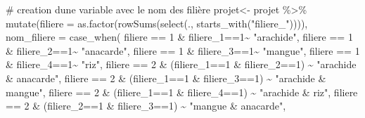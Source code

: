 \documentclass[
  letterpaper,
  DIV=11,
  numbers=noendperiod]{scrartcl}
\newenvironment{Shaded}{\begin{snugshade}}{\end{snugshade}}
\newcommand{\AttributeTok}[1]{\textcolor[rgb]{0.40,0.45,0.13}{#1}}
\newcommand{\CommentTok}[1]{\textcolor[rgb]{0.37,0.37,0.37}{#1}}
\newcommand{\DecValTok}[1]{\textcolor[rgb]{0.68,0.00,0.00}{#1}}
\newcommand{\FunctionTok}[1]{\textcolor[rgb]{0.28,0.35,0.67}{#1}}
\newcommand{\NormalTok}[1]{\textcolor[rgb]{0.00,0.23,0.31}{#1}}
\newcommand{\OtherTok}[1]{\textcolor[rgb]{0.00,0.23,0.31}{#1}}
\newcommand{\SpecialCharTok}[1]{\textcolor[rgb]{0.37,0.37,0.37}{#1}}
\newcommand{\StringTok}[1]{\textcolor[rgb]{0.13,0.47,0.30}{#1}}
\begin{document}
\begin{Shaded}
\begin{Highlighting}[]
\CommentTok{\# creation d\textquotesingle{}une variable avec le nom des filière}
\NormalTok{projet}\OtherTok{\textless{}{-}}\NormalTok{ projet }\SpecialCharTok{\%\textgreater{}\%} 
            \FunctionTok{mutate}\NormalTok{(}\AttributeTok{filiere =} \FunctionTok{as.factor}\NormalTok{(}\FunctionTok{rowSums}\NormalTok{(}\FunctionTok{select}\NormalTok{(., }\FunctionTok{starts\_with}\NormalTok{(}\StringTok{"filiere\_"}\NormalTok{)))),}
                    \AttributeTok{nom\_filiere =} \FunctionTok{case\_when}\NormalTok{(}
\NormalTok{                                      filiere }\SpecialCharTok{==} \DecValTok{1} \SpecialCharTok{\&}\NormalTok{ filiere\_1}\SpecialCharTok{==}\DecValTok{1}\SpecialCharTok{\textasciitilde{}} \StringTok{"arachide"}\NormalTok{,}
\NormalTok{                                      filiere }\SpecialCharTok{==} \DecValTok{1} \SpecialCharTok{\&}\NormalTok{ filiere\_2}\SpecialCharTok{==}\DecValTok{1}\SpecialCharTok{\textasciitilde{}} \StringTok{"anacarde"}\NormalTok{,}
\NormalTok{                                      filiere }\SpecialCharTok{==} \DecValTok{1} \SpecialCharTok{\&}\NormalTok{ filiere\_3}\SpecialCharTok{==}\DecValTok{1}\SpecialCharTok{\textasciitilde{}} \StringTok{"mangue"}\NormalTok{,}
\NormalTok{                                      filiere }\SpecialCharTok{==} \DecValTok{1} \SpecialCharTok{\&}\NormalTok{ filiere\_4}\SpecialCharTok{==}\DecValTok{1}\SpecialCharTok{\textasciitilde{}} \StringTok{"riz"}\NormalTok{,}
\NormalTok{                                      filiere }\SpecialCharTok{==} \DecValTok{2} \SpecialCharTok{\&}\NormalTok{ (filiere\_1}\SpecialCharTok{==}\DecValTok{1} \SpecialCharTok{\&}\NormalTok{ filiere\_2}\SpecialCharTok{==}\DecValTok{1}\NormalTok{) }\SpecialCharTok{\textasciitilde{}} \StringTok{"arachide \& anacarde"}\NormalTok{,}
\NormalTok{                                      filiere }\SpecialCharTok{==} \DecValTok{2} \SpecialCharTok{\&}\NormalTok{ (filiere\_1}\SpecialCharTok{==}\DecValTok{1} \SpecialCharTok{\&}\NormalTok{ filiere\_3}\SpecialCharTok{==}\DecValTok{1}\NormalTok{) }\SpecialCharTok{\textasciitilde{}} \StringTok{"arachide \& mangue"}\NormalTok{,}
\NormalTok{                                      filiere }\SpecialCharTok{==} \DecValTok{2} \SpecialCharTok{\&}\NormalTok{ (filiere\_1}\SpecialCharTok{==}\DecValTok{1} \SpecialCharTok{\&}\NormalTok{ filiere\_4}\SpecialCharTok{==}\DecValTok{1}\NormalTok{) }\SpecialCharTok{\textasciitilde{}} \StringTok{"arachide \& riz"}\NormalTok{,}
\NormalTok{                                      filiere }\SpecialCharTok{==} \DecValTok{2} \SpecialCharTok{\&}\NormalTok{ (filiere\_2}\SpecialCharTok{==}\DecValTok{1} \SpecialCharTok{\&}\NormalTok{ filiere\_3}\SpecialCharTok{==}\DecValTok{1}\NormalTok{) }\SpecialCharTok{\textasciitilde{}} \StringTok{"mangue \& anacarde"}\NormalTok{,}

\end{Highlighting}
\end{Shaded}
\end{document}
